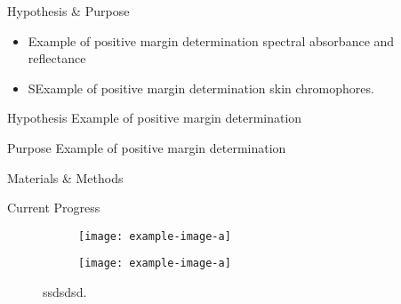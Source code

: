 \documentclass{beamer}
\begin{document}

\begin{frame}{Hypothesis \& Purpose}

\begin{itemize}
\item Example of positive margin determination \textcolor{mDarkYellowComp}{spectral absorbance and reflectance}
\item SExample of positive margin determination \textcolor{mDarkYellowComp}{skin chromophores}. 
 
\end{itemize}


\begin{alertblock}{Hypothesis}
Example of positive margin determination
\end{alertblock}

\begin{exampleblock}{Purpose}
Example of positive margin determination
\end{exampleblock}

\end{frame}


\begin{frame}{Materials \& Methods}
   
  
\end{frame}


\begin{frame}{Current Progress}



\begin{figure}
\centering
\begin{subfigure}{0.3\textwidth}
  \centering
	\texttt{[image: example-image-a]}
\end{subfigure} %
\begin{subfigure}{0.3\textwidth}
  \centering
	\texttt{[image: example-image-a]}
\end{subfigure}
\caption{ssdsdsd.}
\end{figure}


\end{frame}

\end{document}

